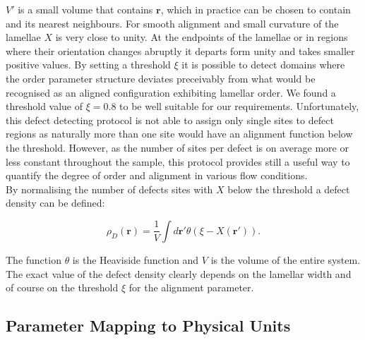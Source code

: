 \documentclass[8.5pt,twoside,twocolumn]{article}
\begin{document}
$V'$ is a small volume that contains $\mathbf r$, which in practice can be chosen to contain  and its nearest neighbours.
For smooth alignment and small curvature of the lamellae $X$ is very close to unity.
At the endpoints of the lamellae or in regions where their orientation changes abruptly it departs form unity and takes smaller positive values.
By setting a threshold $\xi$ it is possible to detect domains where the order parameter structure deviates preceivably from what would be recognised as an aligned configuration exhibiting lamellar order.
We found a threshold value of $\xi=0.8$ to be well suitable for our requirements.
Unfortunately, this defect detecting protocol is not able to assign only single sites to defect regions as naturally more than one site would have an alignment function below the threshold.
However, as the number of sites per defect is on average more or less constant throughout the sample, this protocol provides still a useful way to quantify the degree of order and alignment in various flow conditions.\\
By normalising the number of defects sites with $X$ below the threshold a defect density can be defined:

\begin{equation}\label{defect density}
\rho_D({\mathbf r})=\frac{1}{V} \int d{\mathbf r'} \theta(\xi-X(\mathbf r')).  
\end{equation}

The function $\theta$ is the Heaviside function and $V$ is the volume of the entire system.
The exact value of the defect density clearly depends on the lamellar width and of course on the threshold $\xi$ for the alignment parameter.

\subsection*{Parameter Mapping to Physical Units}
\end{document}
